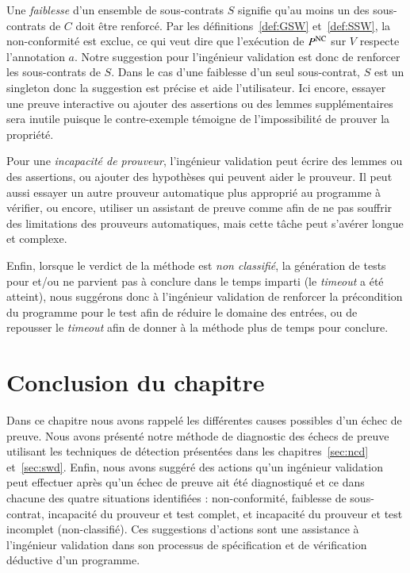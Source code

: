 Une \emph{faiblesse} d'un ensemble de sous-contrats $S$ signifie qu'au moins un
des sous-contrats de $C$ doit être renforcé.
Par les définitions~\ref{def:GSW} et~\ref{def:SSW}, la non-conformité est
exclue, ce qui veut dire que l'exécution de $P^{\mathrm{NC}}$ sur $V$ respecte
l'annotation $a$.
Notre suggestion pour l'ingénieur validation est donc de renforcer les
sous-contrats de $S$.
Dans le cas d'une faiblesse d'un seul sous-contrat, $S$ est un singleton donc
la suggestion est précise et aide l'utilisateur.
Ici encore, essayer une preuve interactive ou ajouter des assertions ou des
lemmes supplémentaires sera inutile puisque le contre-exemple témoigne de
l'impossibilité de prouver la propriété.

Pour une \emph{incapacité de prouveur}, l'ingénieur validation peut écrire des
lemmes ou des assertions, ou ajouter des hypothèses qui peuvent aider le
prouveur.
Il peut aussi essayer un autre prouveur automatique plus approprié au programme
à vérifier, ou encore, utiliser un assistant de preuve comme \coq afin de ne
pas souffrir des limitations des prouveurs automatiques, mais cette tâche peut
s'avérer longue et complexe.

Enfin, lorsque le verdict de la méthode est \emph{non classifié}, la génération
de tests pour \NCD et/ou \SWD ne parvient pas à conclure dans le temps imparti
(le {\em timeout} a été atteint), nous suggérons donc à l'ingénieur validation
de renforcer la précondition du programme pour le test afin de réduire le
domaine des entrées, ou de repousser le {\em timeout} afin de donner à la
méthode plus de temps pour conclure.


\section*{Conclusion du chapitre}


Dans ce chapitre nous avons rappelé les différentes causes possibles d'un échec
de preuve.
Nous avons présenté notre méthode de diagnostic des échecs de
preuve utilisant les techniques de détection présentées dans les
chapitres~\ref{sec:ncd} et~\ref{sec:swd}.
Enfin, nous avons suggéré des actions qu'un ingénieur validation peut effectuer
après qu'un échec de preuve ait été diagnostiqué et ce dans chacune des quatre
situations identifiées : non-conformité, faiblesse de sous-contrat, incapacité
du prouveur et test complet, et incapacité du prouveur et test incomplet
(non-classifié).
Ces suggestions d'actions sont une assistance à l'ingénieur validation dans son
processus de spécification et de vérification déductive d'un programme.
